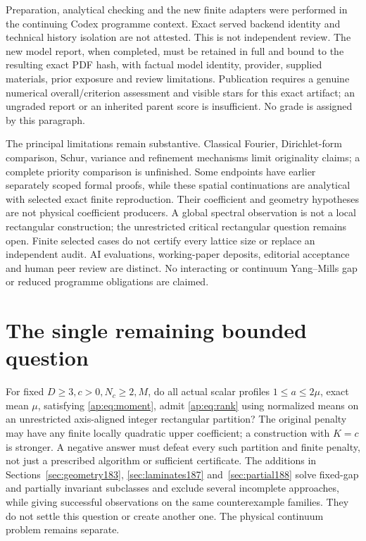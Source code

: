 \documentclass[11pt]{article}
\begin{document}
Preparation, analytical checking and the new finite adapters were performed
in the continuing Codex programme context. Exact served backend identity
and technical history isolation are not attested. This is not independent
review. The new model report, when completed, must be retained in full and
bound to the resulting exact PDF hash, with factual model identity,
provider, supplied materials, prior exposure and review limitations.
Publication requires a genuine numerical overall/criterion assessment and
visible stars for this exact artifact; an ungraded report or an inherited
parent score is insufficient. No grade is assigned by this paragraph.

The principal limitations remain substantive. Classical Fourier,
Dirichlet-form comparison, Schur, variance and refinement mechanisms limit
originality claims; a complete priority comparison is unfinished. Some
endpoints have earlier separately scoped formal proofs, while these spatial
continuations are analytical with selected exact finite reproduction.
Their coefficient and geometry hypotheses are not physical coefficient
producers. A global spectral observation is not a local rectangular
construction; the unrestricted critical rectangular question remains open.
Finite selected cases do not certify every lattice size or replace an
independent audit. AI evaluations, working-paper deposits, editorial
acceptance and human peer review are distinct. No interacting or continuum
Yang--Mills gap or reduced programme obligations are claimed.
\section{The single remaining bounded question}
For fixed $D\geq3,c>0,N_c\geq2,M$, do all actual scalar profiles
$1\leq a\leq2\mu$, exact mean $\mu$, satisfying \eqref{ap:eq:moment}, admit
\eqref{ap:eq:rank} using normalized means on an unrestricted axis-aligned
integer rectangular partition? The original penalty may have any finite
locally quadratic upper coefficient; a construction with $K=c$ is stronger.
A negative answer must defeat every such partition and finite penalty,
not just a prescribed algorithm or sufficient certificate. The additions
in Sections~\ref{sec:geometry183}, \ref{sec:laminates187} and~\ref{sec:partial188} solve fixed-gap and partially invariant subclasses and exclude
several incomplete approaches, while giving successful observations on
the same counterexample families. They do not settle this question or
create another one. The physical continuum problem remains separate.
\end{document}
